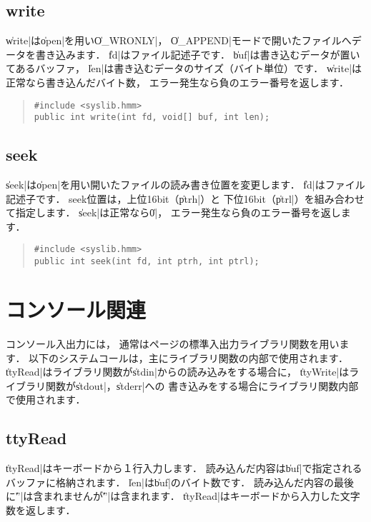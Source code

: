 \subsection{write}

\|write|は\|open|を用い\|O_WRONLY|，
\|O_APPEND|モードで開いたファイルへデータを書き込みます．
\|fd|はファイル記述子です．
\|buf|は書き込むデータが置いてあるバッファ，
\|len|は書き込むデータのサイズ（バイト単位）です．
\|write|は正常なら書き込んだバイト数，
エラー発生なら負のエラー番号を返します．

\begin{quote}
\begin{verbatim}
#include <syslib.hmm>
public int write(int fd, void[] buf, int len);
\end{verbatim}
\end{quote}

\subsection{seek}

\|seek|は\|open|を用い開いたファイルの読み書き位置を変更します．
\|fd|はファイル記述子です．
seek位置は，上位16bit（\|ptrh|）と
下位16bit（\|ptrl|）を組み合わせて指定します．
\|seek|は正常なら\|0|，
エラー発生なら負のエラー番号を返します．

\begin{quote}
\begin{verbatim}
#include <syslib.hmm>
public int seek(int fd, int ptrh, int ptrl);
\end{verbatim}
\end{quote}

\section{コンソール関連}

コンソール入出力には，
通常は\pageref{chap4:stdio}ページの標準入出力ライブラリ関数を用います．
以下のシステムコールは，主にライブラリ関数の内部で使用されます．
\|ttyRead|はライブラリ関数が\|stdin|からの読み込みをする場合に，
\|ttyWrite|はライブラリ関数が\|stdout|，\|stderr|への
書き込みをする場合にライブラリ関数内部で使用されます．

\subsection{ttyRead}

\|ttyRead|はキーボードから１行入力します．
読み込んだ内容は\|buf|で指定されるバッファに格納されます．
\|len|は\|buf|のバイト数です．
読み込んだ内容の最後に\|'\0'|は含まれませんが\|'\n'|は含まれます．
\|ttyRead|はキーボードから入力した文字数を返します．

